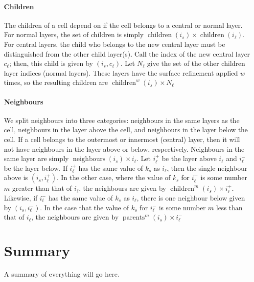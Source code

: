 \paragraph{Children} The children of a cell depend on if the cell belongs to a central or normal layer.
For normal layers, the set of children is simply $\operatorname{children}(i_s) \times \operatorname{children}(i_\ell)$.
For central layers, the child who belongs to the new central layer must be distinguished from the other child layer(s).
Call the index of the new central layer $c_\ell$; then, this child is given by $(i_s, c_\ell)$.
Let $ N_\ell$ give the set of the other children layer indices (normal layers).
These layers have the surface refinement applied $w$ times, so the resulting children are $\operatorname{children}^w(i_s) \times N_\ell$


\paragraph{Neighbours} We split neighbours into three categories: neighbours in the same layers as the cell, neighbours in the layer above the cell, and neighbours in the layer below the cell.
If a cell belongs to the outermost or innermost (central) layer, then it will not have neighbours in the layer above or below, respectively.
Neighbours in the same layer are simply $\operatorname{neighbours}(i_s) \times i_\ell$.
Let $i_\ell^+$ be the layer above $i_\ell$ and $i_\ell^-$ be the layer below.
If $i_\ell^+$ has the same value of $k_s$ as $i_\ell$, then the single neighbour above is $(i_s, i_\ell^+)$.
In the other case, where the value of $k_s$ for $i_\ell^+$ is some number $m$ greater than that of $i_\ell$, the neighbours are given by $\operatorname{children}^m(i_s) \times i_\ell^+$.
Likewise, if $i_\ell^-$ has the same value of $k_s$ as $i_\ell$, there is one neighbour below given by $(i_s, i_\ell^-)$.
In the case that the value of $k_s$ for $i_\ell^-$ is some number $m$ less than that of $i_\ell$, the neighbours are given by $\operatorname{parents}^m(i_s) \times i_\ell^-$

\section{Summary}
A summary of everything will go here.
